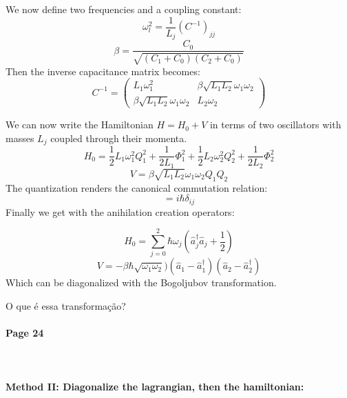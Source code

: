 \documentclass[12pt]{article}
\numberwithin{equation}{subsection}
\newcommand\ask[1]{
{\color{red}
#1
}
}
\newcommand\page[1]{
{
\color{blue}\paragraph{
Page #1
}\mbox{}\\
}
}
\begin{document}
We now define two frequencies and a coupling constant:
\begin{equation}
    \omega_l^2 = \frac{1}{L_j} (C^{-1})_{jj}
\end{equation}
\begin{equation}
    \beta = \frac{C_0}{\sqrt{(C_1+C_0)(C_2+C_0)}}
\end{equation}
Then the inverse capacitance matrix becomes:
\begin{equation}
    C^{-1} = \begin{pmatrix}
    L_1 \omega_1^2 & \beta \sqrt{L_1 L_2} \omega_1\omega_2\\
    \beta \sqrt{L_1 L_2} \omega_1\omega_2 & L_2\omega_2
    \end{pmatrix}
\end{equation}

We can now write the Hamiltonian $H= H_0 +V$ in terms of two oscillators with masses $L_j$ coupled through their momenta. 
\begin{equation}
   H_0 = \frac{1}{2}L_1\omega_1^2Q^2_1 + \frac{1}{2L_1}\Phi^2_1+\frac{1}{2}L_2\omega_2^2Q^2_2 + \frac{1}{2L_2}\Phi^2_2
\end{equation}
\begin{equation}
    V = \beta \sqrt{L_1L_2}\omega_1\omega_2Q_1Q_2
\end{equation}
The quantization renders the canonical commutation relation:
\begin{equation}
    [\hat Q_i, \hat \Phi _j] = i\hbar \delta_{ij}
\end{equation}
Finally we get with the anihilation creation operators:

\begin{equation}
    H_0 = \sum^2_{j=0} \hbar \omega_j \left ( \hat a_j^\dagger\hat a_j + \frac{1}{2}\right )
\end{equation}
\begin{equation}
    V = - \beta \hbar \sqrt{\omega_1\omega_2})(\hat a _1 - \hat a _1^\dagger ) (\hat a _2 - \hat a _2^\dagger)
\end{equation}
Which can be diagonalized with the Bogoljubov transformation.
\ask{O que é essa transformação?}

\page{24}

\paragraph{Method II: Diagonalize the lagrangian, then the hamiltonian: \\}
\end{document}
